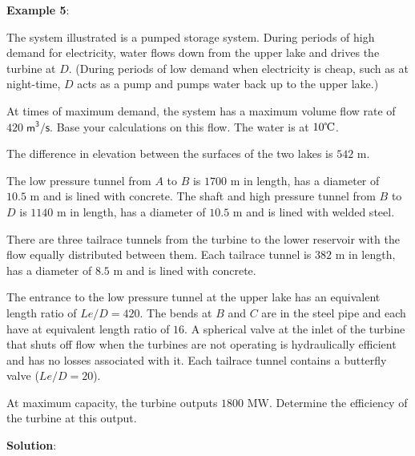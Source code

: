 \documentclass[10pt]{amsart}
\begin{document}
\textbf{Example 5}:




The system illustrated is a pumped storage system. During periods of high demand for electricity, water flows down
from the upper lake and drives the turbine at $D$. (During periods of low demand when electricity is cheap, such as at
night-time, $D$ acts as a pump and pumps water back up to the upper lake.)
\par\medskip
At times of maximum demand, the system has a maximum volume flow rate of $420\;\mathsf{m^3/s}$. Base your
calculations on this flow. The water is at $10\text{\textcelsius}$.
\par\medskip
The difference in elevation between the surfaces of the two lakes is $542\text{	m}$. \par\medskip
The low pressure tunnel from $A$ to $B$ is $1700\text{ m}$ in length, has a diameter of $10.5\text{ m}$
and is lined with concrete. The shaft and high pressure tunnel from $B$ to $D$ is $1140\text{ m}$ in length, has a diameter of $10.5\text{ m}$ and
is lined with welded steel.
\par\medskip
There are three tailrace tunnels from the turbine to the lower reservoir with the flow equally
distributed between them. Each tailrace tunnel is $382\text{ m}$ in
length, has a diameter of $8.5\text{ m}$ and is lined with concrete.

\par\medskip
The entrance to the low pressure tunnel at the upper lake has an equivalent length ratio of $Le/D=420$. The bends at
$B$ and $C$ are in the steel pipe and each have at equivalent length ratio of $16$. A spherical valve at the
inlet of the turbine that shuts off flow when the turbines are not operating is hydraulically efficient and has no
losses associated with it. Each tailrace tunnel contains a butterfly valve ($Le/D=20$).
\par\medskip
At maximum capacity, the turbine outputs $1800 \text{ MW}$. Determine the efficiency of the turbine at this output.

\textbf{Solution}:\\

%
\end{document}
